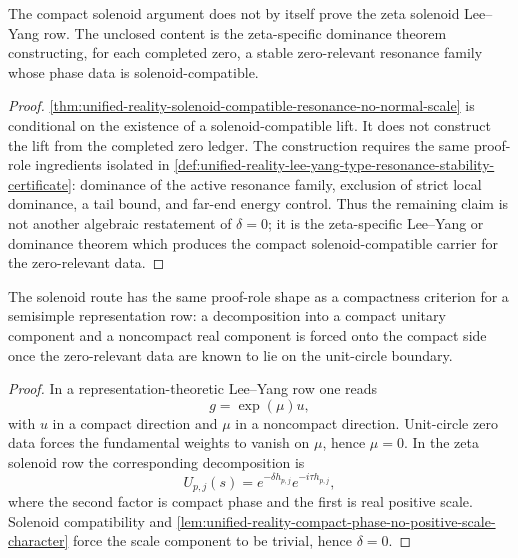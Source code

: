 \begin{corollary}
\label{cor:unified-reality-solenoid-route-unclosed-dominance-theorem}
The compact solenoid argument does not by itself prove the zeta
solenoid Lee--Yang row.  The unclosed content is the zeta-specific
dominance theorem constructing, for each completed zero, a stable
zero-relevant resonance family whose phase data is solenoid-compatible.
\end{corollary}

\begin{proof}
\autoref{thm:unified-reality-solenoid-compatible-resonance-no-normal-scale}
is conditional on the existence of a solenoid-compatible lift.  It does
not construct the lift from the completed zero ledger.  The construction
requires the same proof-role ingredients isolated in
\autoref{def:unified-reality-lee-yang-type-resonance-stability-certificate}:
dominance of the active resonance family, exclusion of strict local
dominance, a tail bound, and far-end energy control.  Thus the remaining
claim is not another algebraic restatement of $\delta=0$; it is the
zeta-specific Lee--Yang or dominance theorem which produces the compact
solenoid-compatible carrier for the zero-relevant data.
\end{proof}

\begin{corollary}
\label{cor:unified-reality-solenoid-representation-theoretic-analogy}
The solenoid route has the same proof-role shape as a compactness
criterion for a semisimple representation row: a decomposition into a
compact unitary component and a noncompact real component is forced onto
the compact side once the zero-relevant data are known to lie on the
unit-circle boundary.
\end{corollary}

\begin{proof}
In a representation-theoretic Lee--Yang row one reads
$$
g=\exp(\mu)u,
$$
with $u$ in a compact direction and $\mu$ in a noncompact direction.
Unit-circle zero data forces the fundamental weights to vanish on
$\mu$, hence $\mu=0$.  In the zeta solenoid row the corresponding
decomposition is
$$
U_{p,j}(s)=e^{-\delta h_{p,j}}e^{-i\tau h_{p,j}},
$$
where the second factor is compact phase and the first is real positive
scale.  Solenoid compatibility and
\autoref{lem:unified-reality-compact-phase-no-positive-scale-character}
force the scale component to be trivial, hence $\delta=0$.
\end{proof}

